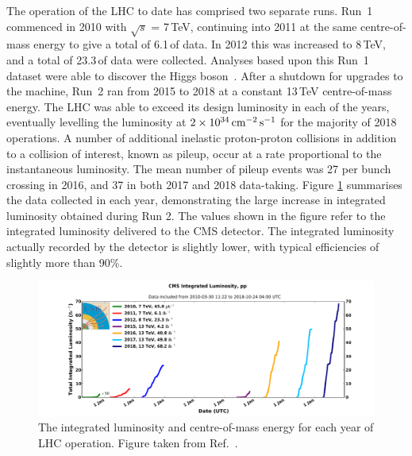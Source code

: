 The operation of the LHC to date has comprised two separate runs.
Run~1 commenced in 2010 with $\sqrt{s}$ = 7\,TeV, continuing into 2011 at the same centre-of-mass energy to give a total of 6.1\,\fbinv of data.
In 2012 this was increased to 8\,TeV, and a total of 23.3\,\fbinv of data were collected.
Analyses based upon this Run~1 dataset were able to discover the Higgs boson~\cite{ATLASdiscovery,CMSdiscovery}.
After a shutdown for upgrades to the machine, Run~2 ran from 2015 to 2018 at a constant 13\,TeV centre-of-mass energy.
The LHC was able to exceed its design luminosity in each of the years, eventually levelling the luminosity at $\SI{2e34}{\ensuremath{\textrm{cm}^{-2}\,\textrm{s}^{-1}}}$ for the majority of 2018 operations.
A number of additional inelastic proton-proton collisions in addition to a collision of interest, known as pileup, occur at a rate proportional to the instantaneous luminosity.
The mean number of pileup events was 27 per bunch crossing in 2016, and 37 in both 2017 and 2018 data-taking.
Figure \ref{fig:detector_Run1andRun2lumi} summarises the data collected in each year, 
demonstrating the large increase in integrated luminosity obtained during Run 2.
The values shown in the figure refer to the integrated luminosity delivered to the CMS detector.
The integrated luminosity actually recorded by the detector is slightly lower, 
with typical efficiencies of slightly more than 90\%. 

\begin{figure}[h!]
  \centering
  \includegraphics[width=\textwidth]{Figures/Detector/Run1andRun2lumi.pdf}
  \caption[LHC integrated luminosity and centre-of-mass energy per year.]
  {
    The integrated luminosity and centre-of-mass energy for each year of LHC operation.
    Figure taken from Ref.~\cite{CMSLumiPublic}.
  }
  \label{fig:detector_Run1andRun2lumi}
\end{figure}

